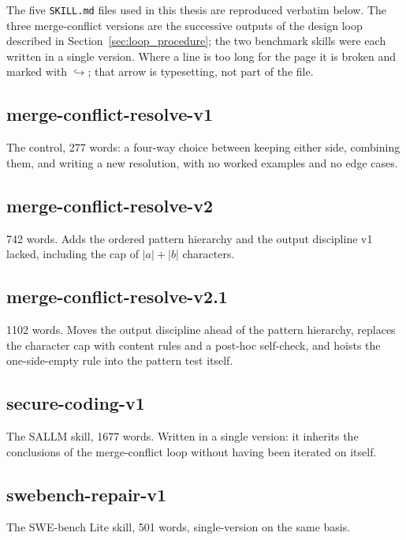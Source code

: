 The five \texttt{SKILL.md} files used in this thesis are reproduced verbatim
below. The three merge-conflict versions are the successive outputs of the design
loop described in Section~\ref{sec:loop_procedure}; the two benchmark skills were
each written in a single version. Where a line is too long for the page it is
broken and marked with $\hookrightarrow$; that arrow is typesetting, not part of
the file.

\subsection{merge-conflict-resolve-v1}

The control, 277 words: a four-way choice between keeping either side, combining
them, and writing a new resolution, with no worked examples and no edge cases.



\subsection{merge-conflict-resolve-v2}

742 words. Adds the ordered pattern hierarchy and the output discipline v1
lacked, including the cap of $|a| + |b|$ characters.



\subsection{merge-conflict-resolve-v2.1}

1102 words. Moves the output discipline ahead of the pattern hierarchy, replaces
the character cap with content rules and a post-hoc self-check, and hoists the
one-side-empty rule into the pattern test itself.



\subsection{secure-coding-v1}

The SALLM skill, 1677 words. Written in a single version: it inherits the
conclusions of the merge-conflict loop without having been iterated on itself.



\subsection{swebench-repair-v1}

The SWE-bench Lite skill, 501 words, single-version on the same basis.


